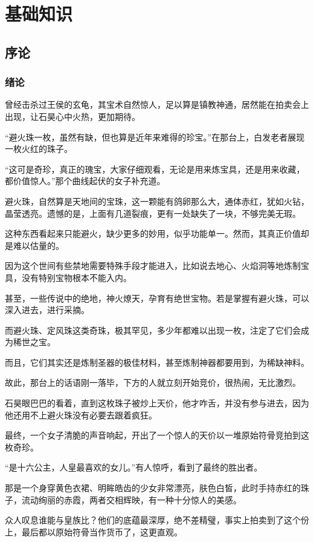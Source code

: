 \part{基础知识}
\chapter{序论}
\thispagestyle{empty}


\section{绪论}

曾经击杀过王侯的玄龟，其宝术自然惊人，足以算是镇教神通，居然能在拍卖会上出现，让石昊心中火热，更加期待。

“避火珠一枚，虽然有缺，但也算是近年来难得的珍宝。”在那台上，白发老者展现一枚火红的珠子。

“这可是奇珍，真正的瑰宝，大家仔细观看，无论是用来炼宝具，还是用来收藏，都价值惊人。”那个曲线起伏的女子补充道。

避火珠，自然算是天地间的宝珠，这一颗能有鸽卵那么大，通体赤红，犹如火钻，晶莹透亮。遗憾的是，上面有几道裂痕，更有一处缺失了一块，不够完美无瑕。

这种东西看起来只能避火，缺少更多的妙用，似乎功能单一。然而，其真正价值却是难以估量的。

因为这个世间有些禁地需要特殊手段才能进入，比如说去地心、火焰洞等地炼制宝具，没有特别宝物根本不能入内。

甚至，一些传说中的绝地，神火燎天，孕育有绝世宝物。若是掌握有避火珠，可以深入进去，进行采摘。

而避火珠、定风珠这类奇珠，极其罕见，多少年都难以出现一枚，注定了它们会成为稀世之宝。

而且，它们其实还是炼制圣器的极佳材料，甚至炼制神器都要用到，为稀缺神料。

故此，那台上的话语刚一落毕，下方的人就立刻开始竞价，很热闹，无比激烈。

石昊眼巴巴的看着，直到这枚珠子被炒上天价，他才咋舌，并没有参与进去，因为他还用不上避火珠没有必要去跟着疯狂。

最终，一个女子清脆的声音响起，开出了一个惊人的天价以一堆原始符骨竞拍到这枚奇珍。

“是十六公主，人皇最喜欢的女儿。”有人惊呼，看到了最终的胜出者。

那是一个身穿黄色衣裙、明眸皓齿的少女非常漂亮，肤色白皙，此时手持赤红的珠子，流动绚丽的赤霞，两者交相辉映，有一种十分惊人的美感。

众人叹息谁能与皇族比？他们的底蕴最深厚，绝不差精璧，事实上拍卖到了这个份上，最后都以原始符骨当作货币了，这更直观。

